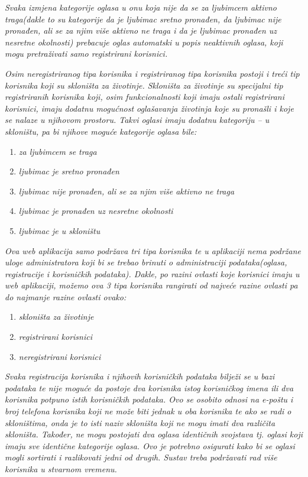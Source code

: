 		\textit{Svaka izmjena kategorije oglasa u onu koja nije da se za ljubimcem aktivno traga(dakle to su kategorije da je ljubimac sretno pronađen, da ljubimac nije pronađen, ali se za njim više aktivno ne traga i da je ljubimac pronađen uz nesretne okolnosti) prebacuje oglas automatski u popis neaktivnih oglasa, koji mogu pretraživati samo registrirani korisnici.}
		
		\textit{Osim neregistriranog tipa korisnika i registriranog tipa korisnika postoji i treći tip korisnika koji su skloništa za životinje. Skloništa za životinje su specijalni tip registriranih korisnika koji, osim funkcionalnosti koji imaju ostali registrirani korisnici, imaju dodatnu mogućnost oglašavanja životinja koje su pronašli i koje se nalaze u njihovom prostoru. Takvi oglasi imaju dodatnu kategoriju – u skloništu, pa bi njihove moguće kategorije oglasa bile:}
		
		\begin{enumerate}
			\item \textit{za ljubimcem se traga}
			\item \textit{ljubimac je sretno pronađen}
			\item \textit{ljubimac nije pronađen, ali se za njim više aktivno ne traga}
			\item \textit{ljubimac je pronađen uz nesretne okolnosti}
			\item \textit{ljubimac je u skloništu}
		\end{enumerate}
		
		\textit{Ova web aplikacija samo podržava tri tipa korisnika te u aplikaciji nema podržane uloge administratora koji bi se trebao brinuti o administraciji podataka(oglasa, registracije i korisničkih podataka). Dakle, po razini ovlasti koje korisnici imaju u web aplikaciji, možemo ova 3 tipa korisnika rangirati od najveće razine ovlasti pa do najmanje razine ovlasti ovako:}
		
		\begin{enumerate}
			\item \textit{skloništa za životinje}
			\item \textit{registrirani korisnici}
			\item \textit{neregistrirani korisnici}
		\end{enumerate}
		
		\textit{Svaka registracija korisnika i njihovih korisničkih podataka bilježi se u bazi podataka te nije moguće da postoje dva korisnika istog korisničkog imena ili dva korisnika potpuno istih korisničkih podataka. Ovo se osobito odnosi na e-poštu i broj telefona korisnika koji ne može biti jednak u oba korisnika te ako se radi o skloništima, onda je to isti naziv skloništa koji ne mogu imati dva različita skloništa. Također, ne mogu postojati dva oglasa identičnih svojstava tj. oglasi koji imaju sve identične kategorije oglasa. Ovo je potrebno osigurati kako bi se oglasi mogli sortirati i razlikovati jedni od drugih. Sustav treba podržavati rad više korisnika u stvarnom vremenu.}
		
